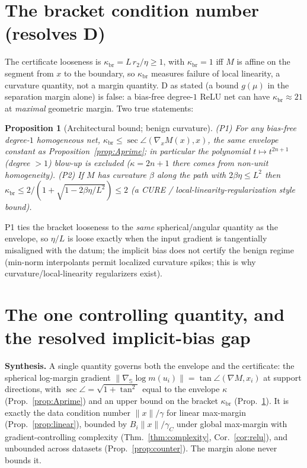 \documentclass[11pt]{article}
\newtheorem{proposition}{Proposition}
\theoremstyle{definition}
\newcommand{\Sph}{\mathbb{S}}
\newcommand{\grad}{\nabla}
\begin{document}
\section{The bracket condition number (resolves D)}\label{sec:D}
The certificate looseness is $\kappa_{\mathrm{br}}=L\,r_2/\eta\ge1$, with
$\kappa_{\mathrm{br}}=1$ iff $M$ is affine on the segment from $x$ to the boundary, so
$\kappa_{\mathrm{br}}$ measures failure of local linearity, a curvature quantity, not
a margin quantity. D as stated (a bound $g(\mu)$ in the separation margin alone) is
false: a bias-free degree-$1$ ReLU net can have $\kappa_{\mathrm{br}}\approx21$ at
\emph{maximal} geometric margin. Two true statements:
\begin{proposition}[Architectural bound; benign curvature]\label{prop:D}
\textup{(P1)} For any bias-free degree-$1$ homogeneous net,
$\kappa_{\mathrm{br}}\le\sec\angle(\grad_xM(x),x)$, the same envelope constant as
Proposition~\ref{prop:Aprime}; in particular the polynomial $t\mapsto t^{2n+1}$
(degree $>1$) blow-up is excluded ($\kappa=2n+1$ there comes from non-unit
homogeneity). \textup{(P2)} If $M$ has curvature $\beta$ along the path with
$2\beta\eta\le L^2$ then $\kappa_{\mathrm{br}}\le 2/(1+\sqrt{1-2\beta\eta/L^2})\le2$
(a CURE / local-linearity-regularization style bound).
\end{proposition}
\noindent P1 ties the bracket looseness to the \emph{same} spherical/angular
quantity as the envelope, so $\eta/L$ is loose exactly when the input gradient is
tangentially misaligned with the datum; the implicit bias does not certify the benign
regime (min-norm interpolants permit localized curvature spikes; this is why
curvature/local-linearity regularizers exist).

\section{The one controlling quantity, and the resolved implicit-bias gap}\label{sec:open}
\textbf{Synthesis.} A single quantity governs both the envelope and the certificate:
the spherical log-margin gradient $\|\grad_{\Sph}\log m(u_i)\|=\tan\angle(\grad M,x_i)$
at support directions, with $\sec\angle=\sqrt{1+\tan^2}$ equal to the envelope
$\kappa$ (Prop.~\ref{prop:Aprime}) and an upper bound on the bracket
$\kappa_{\mathrm{br}}$ (Prop.~\ref{prop:D}). It is exactly the data condition number
$\|x\|/\gamma$ for linear max-margin (Prop.~\ref{prop:linear}), bounded by
$B_i\|x\|/\gamma_C$ under global max-margin with gradient-controlling complexity
(Thm.~\ref{thm:complexity}, Cor.~\ref{cor:relu}), and unbounded across datasets
(Prop.~\ref{prop:counter}). The margin alone never bounds it.
\end{document}
